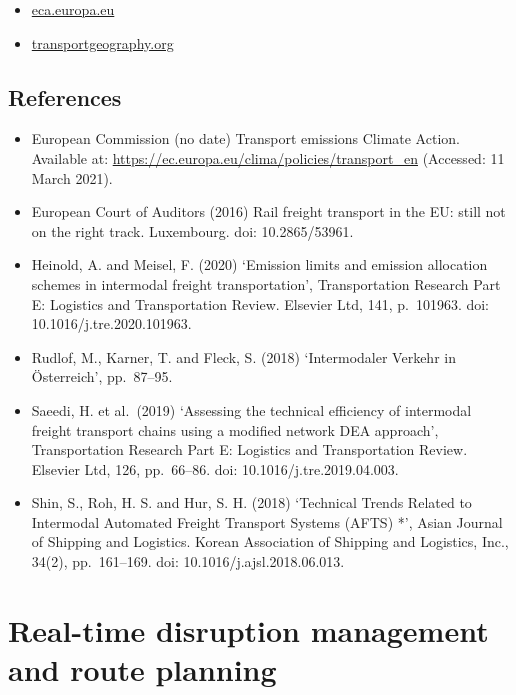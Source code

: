 \documentclass[
]{book}
\providecommand{\tightlist}{%
  \setlength{\itemsep}{0pt}\setlength{\parskip}{0pt}}
\begin{document}
\begin{itemize}
\tightlist
\item
  \href{https://www.eca.europa.eu/en/Pages/DocItem.aspx?did=36398}{eca.europa.eu}
\item
  \href{https://transportgeography.org/contents/chapter5/intermodal-transportation-containerization/}{transportgeography.org}
\end{itemize}

\hypertarget{references-19}{%
\subsection*{References}\label{references-19}}

\begin{itemize}
\tightlist
\item
  European Commission (no date) Transport emissions \textbar{} Climate Action. Available at: \url{https://ec.europa.eu/clima/policies/transport_en} (Accessed: 11 March 2021).
\item
  European Court of Auditors (2016) Rail freight transport in the EU: still not on the right track. Luxembourg. doi: 10.2865/53961.
\item
  Heinold, A. and Meisel, F. (2020) `Emission limits and emission allocation schemes in intermodal freight transportation', Transportation Research Part E: Logistics and Transportation Review. Elsevier Ltd, 141, p.~101963. doi: 10.1016/j.tre.2020.101963.
\item
  Rudlof, M., Karner, T. and Fleck, S. (2018) `Intermodaler Verkehr in Österreich', pp.~87--95.
\item
  Saeedi, H. et al.~(2019) `Assessing the technical efficiency of intermodal freight transport chains using a modified network DEA approach', Transportation Research Part E: Logistics and Transportation Review. Elsevier Ltd, 126, pp.~66--86. doi: 10.1016/j.tre.2019.04.003.
\item
  Shin, S., Roh, H. S. and Hur, S. H. (2018) `Technical Trends Related to Intermodal Automated Freight Transport Systems (AFTS) *', Asian Journal of Shipping and Logistics. Korean Association of Shipping and Logistics, Inc., 34(2), pp.~161--169. doi: 10.1016/j.ajsl.2018.06.013.
\end{itemize}

\hypertarget{disruption_management}{%
\section{Real-time disruption management and route planning}\label{disruption_management}}
\end{document}
